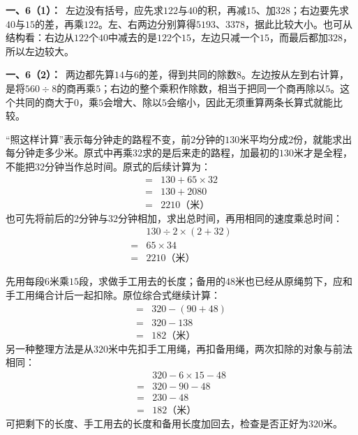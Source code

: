 \documentclass[multi=snippet,border=0pt]{standalone}
\newenvironment{snippet}[3]{\begin{minipage}{#1bp}\color{answerred}\fontsize{#2}{#3}\selectfont\raggedright}{\end{minipage}}
\begin{document}
\begin{snippet}{505}{11.5}{14}\textbf{一、6（1）：}\ 左边没有括号，应先求\(122\)与\(40\)的积，再减\(15\)、加\(328\)；右边要先求\(40\)与\(15\)的差，再乘\(122\)。左、右两边分别算得\(5193\)、\(3378\)，据此比较大小。也可从结构看：右边从\(122\)个\(40\)中减去的是\(122\)个\(15\)，左边只减一个\(15\)，而最后都加\(328\)，所以左边较大。\end{snippet}
\begin{snippet}{505}{11.5}{14}\textbf{一、6（2）：}\ 两边都先算\(14\)与\(6\)的差，得到共同的除数\(8\)。左边按从左到右计算，是将\(560\div8\)的商再乘\(5\)；右边的整个乘积作除数，相当于把同一个商再除以\(5\)。这个共同的商大于\(0\)，乘\(5\)会增大、除以\(5\)会缩小，因此无须重算两条长算式就能比较。\end{snippet}
\begin{snippet}{505}{11.5}{14}“照这样计算”表示每分钟走的路程不变，前\(2\)分钟的\(130\)米平均分成\(2\)份，就能求出每分钟走多少米。原式中再乘\(32\)求的是后来走的路程，加最初的\(130\)米才是全程，不能把\(32\)分钟当作总时间。原式的后续计算为：\[\begin{aligned}={}&130+65\times32\\={}&130+2080\\={}&2210\text{（米）}\end{aligned}\]也可先将前后的\(2\)分钟与\(32\)分钟相加，求出总时间，再用相同的速度乘总时间：\[\begin{aligned}&130\div2\times(2+32)\\={}&65\times34\\={}&2210\text{（米）}\end{aligned}\]\end{snippet}
\begin{snippet}{505}{11.5}{14}先用每段\(6\)米乘\(15\)段，求做手工用去的长度；备用的\(48\)米也已经从原绳剪下，应和手工用绳合计后一起扣除。原位综合式继续计算：\[\begin{aligned}={}&320-(90+48)\\={}&320-138\\={}&182\text{（米）}\end{aligned}\]另一种整理方法是从\(320\)米中先扣手工用绳，再扣备用绳，两次扣除的对象与前法相同：\[\begin{aligned}&320-6\times15-48\\={}&320-90-48\\={}&230-48\\={}&182\text{（米）}\end{aligned}\]可把剩下的长度、手工用去的长度和备用长度加回去，检查是否正好为\(320\)米。\end{snippet}
\end{document}
